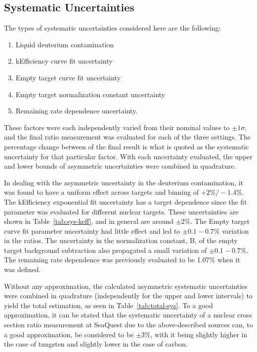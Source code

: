 \subsection{Systematic Uncertainties}

The types of systematic uncertainties considered here are the following:
\begin{enumerate}
	\item Liquid deuterium contamination
	\item kEfficiency curve fit uncertainty
	\item Empty target curve fit uncertainty
	\item Empty target normalization constant uncertainty
	\item Remaining rate dependence uncertainty.
\end{enumerate}
These factors were each independently varied from their nominal values to $\pm1\sigma$, and the final ratio measurement was evaluated for each of the three settings. The percentage change between of the final result is what is quoted as the systematic uncertainty for that particular factor. With each uncertainty evaluated, the upper and lower bounds of asymmetric uncertainties were combined in quadrature.

In dealing with the asymmetric uncertainty in the deuterium contamination, it was found to have a uniform effect across targets and binning of $+2\% / -1.4\%$. The kEfficiency exponential fit uncertainty has a target dependence since the fit parameter was evaluated for different nuclear targets. These uncertainties are shown in Table~\ref{tab:sys-keff}, and in general are around $\pm2\%$. The Empty target curve fit parameter uncertainty had little effect and led to $\pm0.1-0.7\%$ variation in the ratios. The uncertainty in the normalization constant, B, of the empty target background subtraction also propagated a small variation of $\pm0.1-0.7\%$. The remaining rate dependence was previously evaluated to be 1.07\% when it was defined.

Without any approximation, the calculated asymmetric systematic uncertainties were combined in quadrature (independently for the upper and lower intervals) to yield the total estimation, as seen in Table~\ref{tab:total-sys}. To a good approximation, it can be stated that the systematic uncertainty of a nuclear cross section ratio measurement at SeaQuest due to the above-described sources can, to a good approximation, be considered to be $\pm3\%$, with it being slightly higher in the case of tungsten and slightly lower in the case of carbon.


